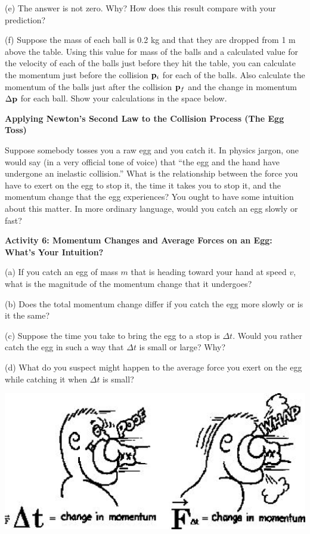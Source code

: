 (e) The answer is not zero. Why? How does this result compare with your 
prediction?
\newpage

(f) Suppose the mass of each ball is 0.2 kg and that they are dropped from 1
m above the table. Using this value for mass of the balls and a calculated value
for the velocity of each of the balls just before they hit the table, you can
calculate the momentum just before the collision \( {{\bf p}_{i}} \)
for each of the balls. Also calculate the momentum of the balls just after the
collision \( {{\bf p}_{f}} \) and the change in momentum \( \Delta {\bf p} \)
for each ball. Show your calculations in the space below.
\vspace{30mm}

\textbf{Applying Newton's Second Law to the Collision Process (The Egg Toss)}

Suppose somebody tosses you a raw egg and you catch it. In physics jargon, one
would say (in a very official tone of voice) that ``the egg and the
hand have undergone an inelastic collision.'' What is the relationship
between the force you have to exert on the egg to stop it, the time it takes
you to stop it, and the momentum change that the egg experiences? You ought
to have some intuition about this matter. In more ordinary language, would you
catch an egg slowly or fast?

\textbf{Activity 6: Momentum Changes and Average Forces on an Egg: What's Your
Intuition?} 

(a) If you catch an egg of mass $m$ that is heading toward your hand at speed
$v$, what is the magnitude of the momentum change that it undergoes?
\vspace{10mm}

(b) Does the total momentum change differ if you catch the egg more slowly or
is it the same?
\vspace{10mm}

(c) Suppose the time you take to bring the egg to a stop is \( \Delta  t\).
Would you rather catch the egg in such a way that \( \Delta  t\) is small or
large? Why?
\vspace{10mm}

(d) What do you suspect might happen to the average force you exert on the egg
while catching it when \( \Delta t \) is small?
\vspace{20mm}

\vspace{0.3cm}
{\par\centering \includegraphics{momentum/momentum_fig2.eps} \par}
\vspace{0.3cm}

